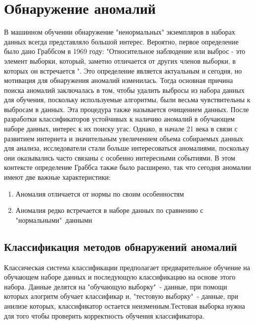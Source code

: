 \section{Обнаружение аномалий}
В машинном обучении обнаружение  "ненормальных" экземпляров в наборах данных всегда представляло большой интерес. Вероятно, первое определение было дано Граббсом\cite{Book02} в 1969 году: "Относительное наблюдение или выброс - это элемент выборки, который, заметно отличается от других членов выборки, в которых он встречается ".
Это определение является актуальным и сегодня, но мотивация для обнаружения аномалий изменилась. Тогда основная причина поиска аномалий заключалась в том, чтобы удалить выбросы из набора данных для обучения, поскольку   используемые алгоритмы, были весьма чувствительны к выбросам в данных. Эта процедура также называется очищением данных. После разработки классификаторов устойчивых к наличию аномалий в обучающем наборе данных, интерес к их поиску угас. Однако, в начале 21 века в связи с развитием интернета и значительным увеличением объема собираемых данных для анализа, исследователи стали больше интересоваться  аномалиями, поскольку они  оказывались часто связаны с особенно интересными событиями.  В этом контексте определение Граббса также было расширено, так что сегодня аномалии имеют две важные характеристики:
\begin{enumerate}
	\item Аномалия отличается от нормы по своим особенностям
	\item Аномалия редко встречается в наборе данных по сравнению с "нормальными"\  данными
\end{enumerate}
\subsection{Классификация методов обнаружений аномалий}
Классическая система классификации предполагает предварительное обучение на обучающем наборе данных и последующую классификацию на основе этого набора. Данные делятся на "обучающую выборку"\ - данные, при помощи которых алогритм обучает классификар и, "тестовую выборку"\ - данные, при анилизе которых, классификатор остается неизменным.Тестовая выборка нужна для того чтобы проверить корректность обучения классификатора.


